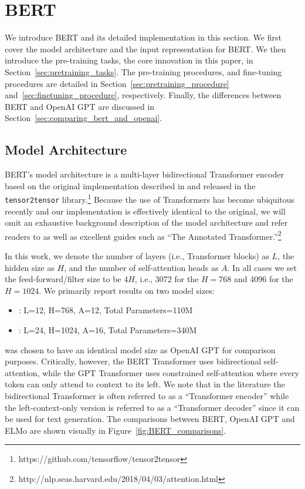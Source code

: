 \section{BERT}
\label{sec:bert}

We introduce BERT and  its detailed implementation in this section. We first cover the model architecture and the input representation for BERT. We then introduce the pre-training tasks, the core innovation in this paper, in Section~\ref{sec:pretraining_tasks}. The pre-training procedures, and fine-tuning procedures are detailed in Section~\ref{sec:pretraining_procedure} and~\ref{sec:finetuning_procedure}, respectively. Finally, the differences between BERT and OpenAI GPT are discussed in Section~\ref{sec:comparing_bert_and_openai}.

\subsection{Model Architecture}
\label{sec:model_architecture}

BERT's model architecture is a multi-layer bidirectional Transformer encoder based on the original implementation described in \citet{vaswani-etal:2017:_atten} and released in the {\tt tensor2tensor} library.\footnote{https://github.com/tensorflow/tensor2tensor} Because the use of Transformers has become ubiquitous recently and our implementation is effectively identical to the original, we will omit an exhaustive background description of the model architecture and refer readers to \citet{vaswani-etal:2017:_atten} as well as excellent guides such as ``The Annotated Transformer.''\footnote{http://nlp.seas.harvard.edu/2018/04/03/attention.html}

In this work, we denote the number of layers (i.e., Transformer blocks) as $L$, the hidden size as $H$, and the number of self-attention heads as $A$. In all cases we set the feed-forward/filter size to be $4H$, i.e., 3072 for the $H=768$ and 4096 for the $H=1024$. We primarily report results on two model sizes:

\begin{itemize}
\item {\bf \bertbase}: L=12, H=768, A=12, Total Parameters=110M
\item {\bf \bertlarge}: L=24, H=1024, A=16, Total Parameters=340M
\end{itemize}

\bertbase was chosen to have an identical model size as OpenAI GPT for comparison purposes. Critically, however, the BERT Transformer uses bidirectional self-attention, while the GPT Transformer uses constrained self-attention where every token can only attend to context to its left. We note that in the literature the bidirectional Transformer is often referred to as a ``Transformer encoder'' while the left-context-only version is referred to as a ``Transformer decoder'' since it can be used for text generation. The comparisons between BERT, OpenAI GPT and ELMo are shown visually in Figure~\ref{fig:BERT_comparisons}.


